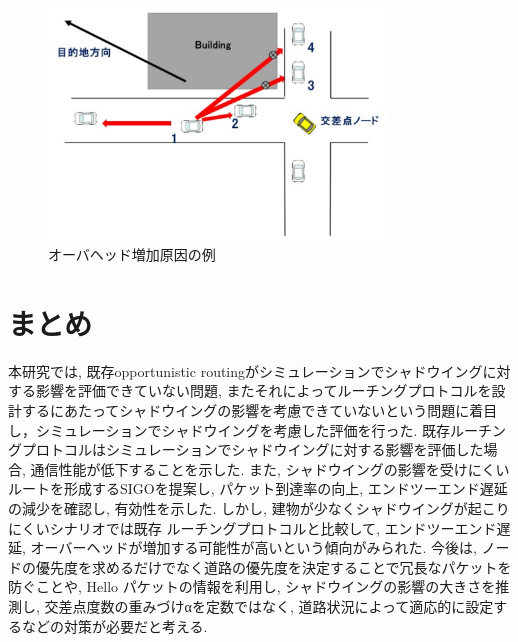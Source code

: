 \documentclass[technicalreport]{ieicej}
\begin{document}
 \begin{figure}[!ht]
\centering
\includegraphics[width=90mm]{figures/Overhead-reason.eps}
\caption{オーバヘッド増加原因の例}
\label{fig:Overhead-reason}
\end{figure}





\section{まとめ}
本研究では, 既存opportunistic routingがシミュレーションでシャドウイングに対する影響を評価できていない問題, またそれによってルーチングプロトコルを設計するにあたってシャドウイングの影響を考慮できていないという問題に着目し，シミュレーションでシャドウイングを考慮した評価を行った. 既存ルーチングプロトコルはシミュレーションでシャドウイングに対する影響を評価した場合, 通信性能が低下することを示した. また, シャドウイングの影響を受けにくいルートを形成するSIGOを提案し, パケット到達率の向上, エンドツーエンド遅延の減少を確認し, 有効性を示した. しかし, 建物が少なくシャドウイングが起こりにくいシナリオでは既存 ルーチングプロトコルと比較して, エンドツーエンド遅延, オーバーヘッドが増加する可能性が高いという傾向がみられた. 今後は, ノードの優先度を求めるだけでなく道路の優先度を決定することで冗長なパケットを防ぐことや, Hello パケットの情報を利用し, シャドウイングの影響の大きさを推測し, 交差点度数の重みづけαを定数ではなく, 道路状況によって適応的に設定するなどの対策が必要だと考える. 
\end{document}
